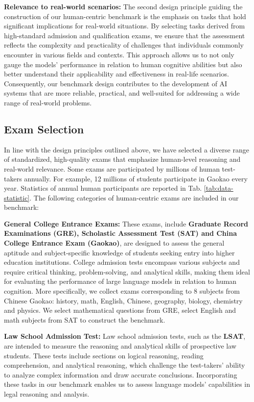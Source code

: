 \par{\textbf{Relevance to real-world scenarios:} The second design principle guiding the construction of our human-centric benchmark is the emphasis on tasks that hold significant implications for real-world situations. By selecting tasks derived from high-standard admission and qualification exams, we ensure that the assessment reflects the complexity and practicality of challenges that individuals commonly encounter in various fields and contexts. This approach allows us to not only gauge the models' performance in relation to human cognitive abilities but also better understand their applicability and effectiveness in real-life scenarios. Consequently, our benchmark design contributes to the development of AI systems that are more reliable, practical, and well-suited for addressing a wide range of real-world problems.}

\subsection{Exam Selection}

In line with the design principles outlined above, we have selected a diverse range of standardized, high-quality exams that emphasize human-level reasoning and real-world relevance. Some exams are participated by millions of human test-takers annually. For example, 12 millions of students participate in Gaokao every year. Statistics of annual human participants are reported in Tab. \ref{tab:data-statistic}.
The following categories of human-centric exams are included in our benchmark:
\par{\textbf{General College Entrance Exams:} These exams, include \textbf{Graduate Record Examinations (GRE), Scholastic Assessment Test (SAT) and China College Entrance Exam (Gaokao)}, are designed to assess the general aptitude and subject-specific knowledge of students seeking entry into higher education institutions. College admission tests encompass various subjects and require critical thinking, problem-solving, and analytical skills, making them ideal for evaluating the performance of large language models in relation to human cognition. More specifically, we collect exams corresponding to 8 subjects from Chinese Gaokao: history, math, English, Chinese, geography, biology, chemistry and physics. We select mathematical questions from GRE, select English and math subjects from SAT to construct the benchmark. }
\par{\textbf{Law School Admission Test:} Law school admission tests, such as the \textbf{LSAT}, are intended to measure the reasoning and analytical skills of prospective law students. These tests include sections on logical reasoning, reading comprehension, and analytical reasoning, which challenge the test-takers' ability to analyze complex information and draw accurate conclusions. Incorporating these tasks in our benchmark enables us to assess language models' capabilities in legal reasoning and analysis.}

